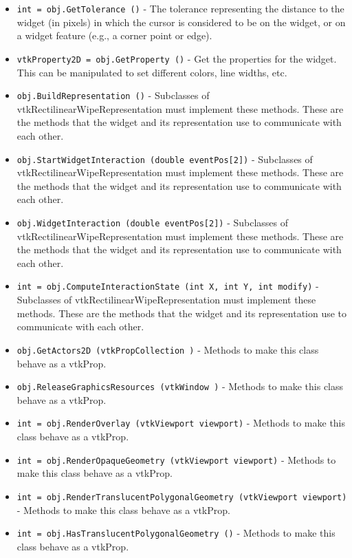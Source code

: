 \begin{itemize}
\item  \verb|int = obj.GetTolerance ()| -  The tolerance representing the distance to the widget (in pixels)
 in which the cursor is considered to be on the widget, or on a
 widget feature (e.g., a corner point or edge).

\item  \verb|vtkProperty2D = obj.GetProperty ()| -  Get the properties for the widget. This can be manipulated to set
 different colors, line widths, etc.

\item  \verb|obj.BuildRepresentation ()| -  Subclasses of vtkRectilinearWipeRepresentation must implement these methods. These
 are the methods that the widget and its representation use to
 communicate with each other.

\item  \verb|obj.StartWidgetInteraction (double eventPos[2])| -  Subclasses of vtkRectilinearWipeRepresentation must implement these methods. These
 are the methods that the widget and its representation use to
 communicate with each other.

\item  \verb|obj.WidgetInteraction (double eventPos[2])| -  Subclasses of vtkRectilinearWipeRepresentation must implement these methods. These
 are the methods that the widget and its representation use to
 communicate with each other.

\item  \verb|int = obj.ComputeInteractionState (int X, int Y, int modify)| -  Subclasses of vtkRectilinearWipeRepresentation must implement these methods. These
 are the methods that the widget and its representation use to
 communicate with each other.

\item  \verb|obj.GetActors2D (vtkPropCollection )| -  Methods to make this class behave as a vtkProp.

\item  \verb|obj.ReleaseGraphicsResources (vtkWindow )| -  Methods to make this class behave as a vtkProp.

\item  \verb|int = obj.RenderOverlay (vtkViewport viewport)| -  Methods to make this class behave as a vtkProp.

\item  \verb|int = obj.RenderOpaqueGeometry (vtkViewport viewport)| -  Methods to make this class behave as a vtkProp.

\item  \verb|int = obj.RenderTranslucentPolygonalGeometry (vtkViewport viewport)| -  Methods to make this class behave as a vtkProp.

\item  \verb|int = obj.HasTranslucentPolygonalGeometry ()| -  Methods to make this class behave as a vtkProp.

\end{itemize}
